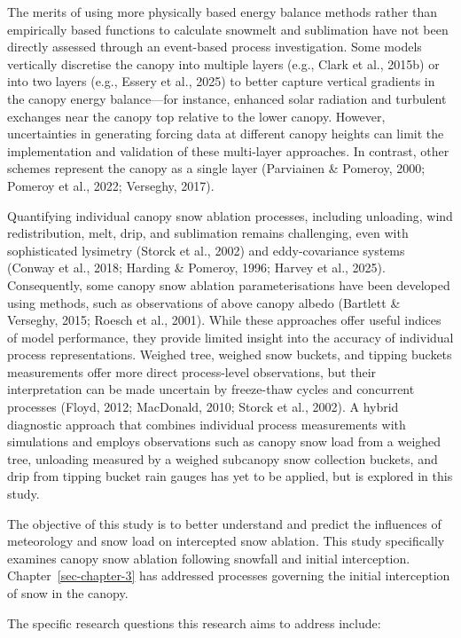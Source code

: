\documentclass[
  letterpaper,
]{tex/uofsthesis-cs}
\begin{document}
The merits of using more physically based energy balance methods rather
than empirically based functions to calculate snowmelt and sublimation
have not been directly assessed through an event-based process
investigation. Some models vertically discretise the canopy into
multiple layers (e.g., Clark et al., 2015b) or into two layers (e.g.,
Essery et al., 2025) to better capture vertical gradients in the canopy
energy balance---for instance, enhanced solar radiation and turbulent
exchanges near the canopy top relative to the lower canopy. However,
uncertainties in generating forcing data at different canopy heights can
limit the implementation and validation of these multi-layer approaches.
In contrast, other schemes represent the canopy as a single layer
(Parviainen \& Pomeroy, 2000; Pomeroy et al., 2022; Verseghy, 2017).

Quantifying individual canopy snow ablation processes, including
unloading, wind redistribution, melt, drip, and sublimation remains
challenging, even with sophisticated lysimetry (Storck et al., 2002) and
eddy-covariance systems (Conway et al., 2018; Harding \& Pomeroy, 1996;
Harvey et al., 2025). Consequently, some canopy snow ablation
parameterisations have been developed using methods, such as
observations of above canopy albedo (Bartlett \& Verseghy, 2015; Roesch
et al., 2001). While these approaches offer useful indices of model
performance, they provide limited insight into the accuracy of
individual process representations. Weighed tree, weighed snow buckets,
and tipping buckets measurements offer more direct process-level
observations, but their interpretation can be made uncertain by
freeze-thaw cycles and concurrent processes (Floyd, 2012; MacDonald,
2010; Storck et al., 2002). A hybrid diagnostic approach that combines
individual process measurements with simulations and employs
observations such as canopy snow load from a weighed tree, unloading
measured by a weighed subcanopy snow collection buckets, and drip from
tipping bucket rain gauges has yet to be applied, but is explored in
this study.

The objective of this study is to better understand and predict the
influences of meteorology and snow load on intercepted snow ablation.
This study specifically examines canopy snow ablation following snowfall
and initial interception. Chapter~\ref{sec-chapter-3} has addressed
processes governing the initial interception of snow in the canopy.

The specific research questions this research aims to address include:
\end{document}

